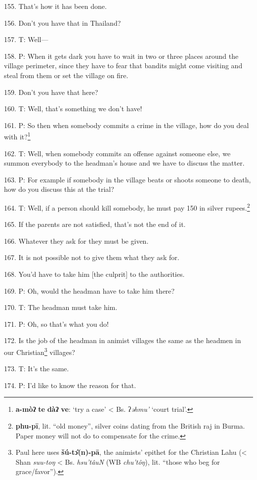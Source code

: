 155. That's how it has been done.

156. Don't you have that in Thailand?

157. T: Well---

158. P: When it gets dark you have to wait in two or three places around the village
perimeter, since they have to fear that bandits might come visiting and steal from
them or set the village on fire.

159. Don't you have that here?

160. T: Well, that's something we don't have!

161. P: So then when somebody commits a crime in the village, how do you deal with
it?\footnote{\textbf{a-mòʔ} \textbf{te} \textbf{dàʔ} \textbf{ve}: `try a case' < Bs. ʔ\textit{əhmu' }`court trial'.}

162. T: Well, when somebody commits an offense against someone else, we summon
everybody to the headman's house and we have to discuss the matter.

163. P: For example if somebody in the village beats or shoots someone to death,
how do you discuss this at the trial?

164. T: Well, if a person should kill somebody, he must pay 150 in silver rupees.\footnote{\textbf{phu-pī}, lit. ``old money'', silver coins dating from the British raj in Burma. Paper money will not do to compensate for the crime.}

165. If the parents are not satisfied, that's not the end of it.

166. Whatever they ask for they must be given.

167. It is not possible not to give them what they ask for.

168. You'd have to take him [the culprit] to the authorities.

169. P: Oh, would the headman have to take him there?

170. T: The headman must take him.

171. P: Oh, so that's what you do!

172. Is the job of the headman in animist villages the same as the headmen in our
Christian\footnote{Paul here uses \textbf{šú-tɔ̂(n)-pā}, the animists' epithet for the Christian Lahu (< Shan \textit{suu-toŋ} < Bs. \textit{hsu'tâuN} (WB \textit{chu'tôŋ}), lit. ``those who beg for grace/favor'').} villages?

173. T: It's the same.

174. P: I'd like to know the reason for that.

